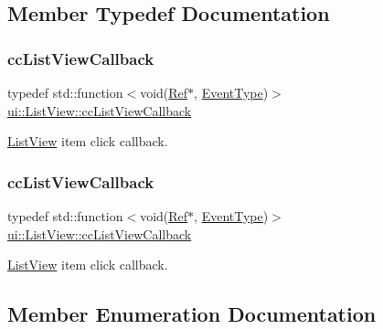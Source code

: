 \subsection{Member Typedef Documentation}
\mbox{\label{classui_1_1ListView_ac67b2dd17d792bb61a9020b3935ffc79}} 
\subsubsection{\texorpdfstring{cc\+List\+View\+Callback}{ccListViewCallback}\hspace{0.1cm}{\footnotesize\ttfamily [1/2]}}
{\footnotesize\ttfamily typedef std\+::function$<$void(\hyperlink{classRef}{Ref}$\ast$, \hyperlink{classui_1_1ListView_a7ef851492220e4bccadbaf16d95d26b9}{Event\+Type})$>$ \hyperlink{classui_1_1ListView_ac67b2dd17d792bb61a9020b3935ffc79}{ui\+::\+List\+View\+::cc\+List\+View\+Callback}}

\hyperlink{classui_1_1ListView}{List\+View} item click callback. \mbox{\label{classui_1_1ListView_ac67b2dd17d792bb61a9020b3935ffc79}} 
\subsubsection{\texorpdfstring{cc\+List\+View\+Callback}{ccListViewCallback}\hspace{0.1cm}{\footnotesize\ttfamily [2/2]}}
{\footnotesize\ttfamily typedef std\+::function$<$void(\hyperlink{classRef}{Ref}$\ast$, \hyperlink{classui_1_1ListView_a7ef851492220e4bccadbaf16d95d26b9}{Event\+Type})$>$ \hyperlink{classui_1_1ListView_ac67b2dd17d792bb61a9020b3935ffc79}{ui\+::\+List\+View\+::cc\+List\+View\+Callback}}

\hyperlink{classui_1_1ListView}{List\+View} item click callback. 

\subsection{Member Enumeration Documentation}
\mbox{\label{classui_1_1ListView_a7ef851492220e4bccadbaf16d95d26b9}} 
